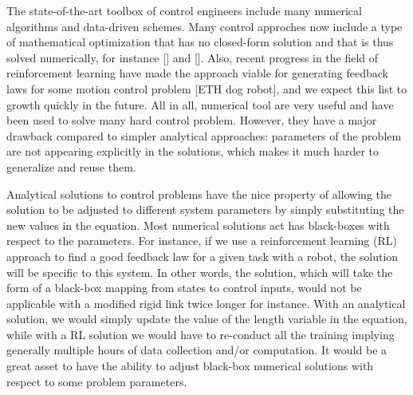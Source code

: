 

The state-of-the-art toolbox of control engineers include many numerical algorithms and data-driven schemes. Many control approches now include a type of mathematical optimization that has no closed-form solution and that is thus solved numerically, for instance [] and []. Also, recent progress in the field of reinforcement learning have made the approach viable for generating feedback laws for some motion control problem [ETH dog robot], and we expect this list to growth quickly in the future. All in all, numerical tool are very useful and have been used to solve many hard control problem. However, they have a major drawback compared to simpler analytical approaches: parameters of the problem are not appearing explicitly in the solutions, which makes it much harder to generalize and reuse them.

Analytical solutions to control problems have the nice property of allowing the solution to be adjusted to different system parameters by simply substituting the new values in the equation. Most numerical solutions act has black-boxes with respect to the parameters. For instance, if we use a reinforcement learning (RL) approach to find a good feedback law for a given task with a robot, the solution will be specific to this system. In other words, the solution, which will take the form of a black-box mapping from states to control inputs, would not be applicable with a modified rigid link twice longer for instance. With an analytical solution, we would simply update the value of the length variable in the equation, while with a RL solution we would have to re-conduct all the training implying generally multiple hours of data collection and/or computation. It would be a great asset to have the ability to adjust black-box numerical solutions with respect to some problem parameters.  

